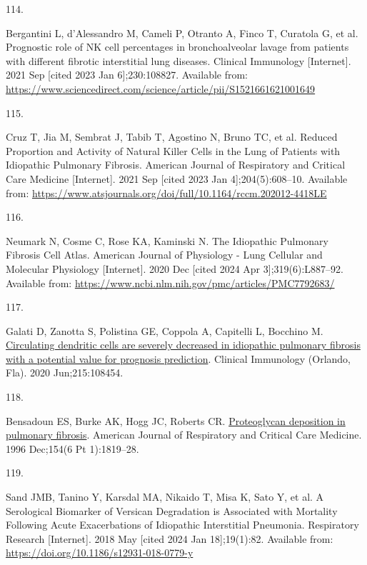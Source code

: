 \documentclass[
]{article}
\newlength{\cslhangindent}
\newlength{\csllabelwidth}
\newenvironment{CSLReferences}[2] %
 {\begin{list}{}{%
  \setlength{\itemindent}{0pt}
  \setlength{\leftmargin}{0pt}
  \setlength{\parsep}{0pt}
  \ifodd #1
   \setlength{\leftmargin}{\cslhangindent}
   \setlength{\itemindent}{-1\cslhangindent}
  \fi
  \setlength{\itemsep}{#2\baselineskip}}}
 {\end{list}}
\newcommand{\CSLLeftMargin}[1]{\parbox[t]{\csllabelwidth}{\strut#1\strut}}
\newcommand{\CSLRightInline}[1]{\parbox[t]{\linewidth - \csllabelwidth}{\strut#1\strut}}
\begin{document}
\begin{CSLReferences}{0}{1}
\CSLLeftMargin{114. }%
\CSLRightInline{Bergantini L, d'Alessandro M, Cameli P, Otranto A, Finco T, Curatola G, et al. Prognostic role of {NK} cell percentages in bronchoalveolar lavage from patients with different fibrotic interstitial lung diseases. Clinical Immunology {[}Internet{]}. 2021 Sep {[}cited 2023 Jan 6{]};230:108827. Available from: \url{https://www.sciencedirect.com/science/article/pii/S1521661621001649}}

\CSLLeftMargin{115. }%
\CSLRightInline{Cruz T, Jia M, Sembrat J, Tabib T, Agostino N, Bruno TC, et al. Reduced {Proportion} and {Activity} of {Natural} {Killer} {Cells} in the {Lung} of {Patients} with {Idiopathic} {Pulmonary} {Fibrosis}. American Journal of Respiratory and Critical Care Medicine {[}Internet{]}. 2021 Sep {[}cited 2023 Jan 4{]};204(5):608--10. Available from: \url{https://www.atsjournals.org/doi/full/10.1164/rccm.202012-4418LE}}

\CSLLeftMargin{116. }%
\CSLRightInline{Neumark N, Cosme C, Rose KA, Kaminski N. The {Idiopathic} {Pulmonary} {Fibrosis} {Cell} {Atlas}. American Journal of Physiology - Lung Cellular and Molecular Physiology {[}Internet{]}. 2020 Dec {[}cited 2024 Apr 3{]};319(6):L887--92. Available from: \url{https://www.ncbi.nlm.nih.gov/pmc/articles/PMC7792683/}}

\CSLLeftMargin{117. }%
\CSLRightInline{Galati D, Zanotta S, Polistina GE, Coppola A, Capitelli L, Bocchino M. \href{https://doi.org/10.1016/j.clim.2020.108454}{Circulating dendritic cells are severely decreased in idiopathic pulmonary fibrosis with a potential value for prognosis prediction}. Clinical Immunology (Orlando, Fla). 2020 Jun;215:108454. }

\CSLLeftMargin{118. }%
\CSLRightInline{Bensadoun ES, Burke AK, Hogg JC, Roberts CR. \href{https://doi.org/10.1164/ajrccm.154.6.8970376}{Proteoglycan deposition in pulmonary fibrosis}. American Journal of Respiratory and Critical Care Medicine. 1996 Dec;154(6 Pt 1):1819--28. }

\CSLLeftMargin{119. }%
\CSLRightInline{Sand JMB, Tanino Y, Karsdal MA, Nikaido T, Misa K, Sato Y, et al. A {Serological} {Biomarker} of {Versican} {Degradation} is {Associated} with {Mortality} {Following} {Acute} {Exacerbations} of {Idiopathic} {Interstitial} {Pneumonia}. Respiratory Research {[}Internet{]}. 2018 May {[}cited 2024 Jan 18{]};19(1):82. Available from: \url{https://doi.org/10.1186/s12931-018-0779-y}}


\end{CSLReferences}
\end{document}
